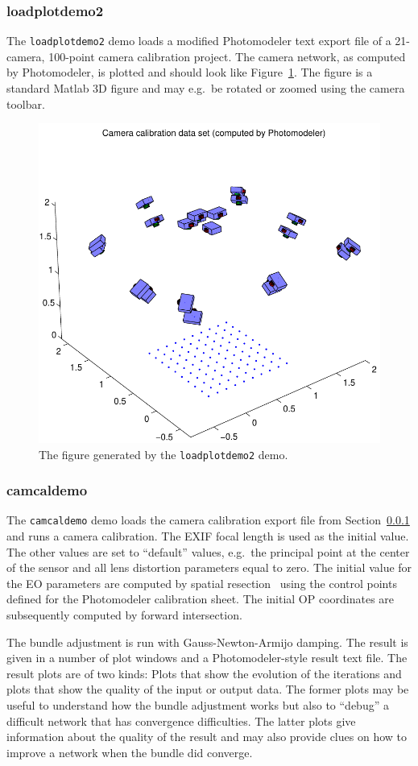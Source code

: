 \documentclass{article}
\begin{document}
\subsubsection{loadplotdemo2}
\label{sec:camcaldata}

The \verb+loadplotdemo2+ demo loads a modified Photomodeler text
export file of a 21-camera, 100-point camera calibration project. The
camera network, as computed by Photomodeler, is plotted and should
look like Figure~\ref{fig:camcalib}. The figure is a standard Matlab
3D figure and may e.g.\ be rotated or zoomed using the camera toolbar.

\begin{figure}
  \centering
  \includegraphics[width=0.6\hsize]{ill/ccam}
  \caption{The figure generated by the \texttt{loadplotdemo2} demo.}
  \label{fig:camcalib}
\end{figure}

\subsubsection{camcaldemo}

The \verb+camcaldemo+ demo loads the camera calibration export file
from Section~\ref{sec:camcaldata} and runs a camera calibration. The
EXIF focal length is used as the initial value. The other values are
set to ``default'' values, e.g.\ the principal point at the center of
the sensor and all lens distortion parameters equal to zero. The
initial value for the EO parameters are computed by spatial
resection~\citep[Chap.~11.1.3.4]{Haralick1994:Review,McGlone2004:Manual} using
the control points defined for the Photomodeler calibration sheet. The
initial OP coordinates are subsequently computed by forward
intersection.

The bundle adjustment is run with Gauss-Newton-Armijo damping. The
result is given in a number of plot windows and a Photomodeler-style
result text file. The result plots are of two kinds: Plots that show
the evolution of the iterations and plots that show the quality of the
input or output data. The former plots may be useful to understand how
the bundle adjustment works but also to ``debug'' a difficult network
that has convergence difficulties. The latter plots give information
about the quality of the result and may also provide clues on how to
improve a network when the bundle did converge.
\end{document}
